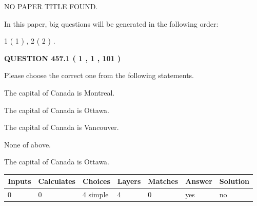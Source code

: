 \documentclass[12pt]{article}
\begin{document}
   
\vspace{0.2in}
   
   
   
   
   
   
 NO PAPER TITLE FOUND.
   
   
   
\vspace{0.2in}
   
In this paper, big questions will be generated in the following order: 
   
   
   1 ( 1 )
 ,
   2 ( 2 )
 .
  
\vspace{0.2in}
  
{\textbf{\Large{QUESTION
457.1 
 ( 1 , 1 , 101 )
}}}
  
  
Please choose the correct one from the following statements.
 
 
The capital of Canada is Montreal.
 
 
The capital of Canada is Ottawa.
 
 
The capital of Canada is Vancouver.
 
 
 None of above.
 
 
\noindent{}
 
 
The capital of Canada is Ottawa.
 
 
\noindent{}
 
 
   
   
   
   
\noindent\begin{tabular}{|l|l|l|l|l|l|l|}
 \hline
Inputs & Calculates & Choices & Layers & Matches & Answer & Solution \\ \hline
 0  & 
 0  & 
 4
  simple  
  & 
 4  & 
 0  & 
  yes & 
  no 
  \\ \hline
 \end{tabular}
   
   
   
   
\noindent{}
   
   
   
\end{document}
